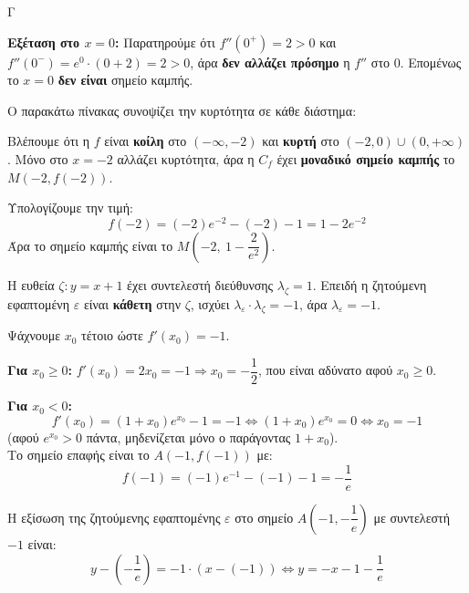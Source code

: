 \begin{thema}{Γ}
\begin{erwthma}
\textbf{Εξέταση στο $x=0$:} Παρατηρούμε ότι $f''(0^+)=2>0$ και $f''(0^-)=e^0\cdot(0+2)=2>0$, άρα \textbf{δεν αλλάζει πρόσημο} η $f''$ στο $0$. Επομένως το $x=0$ \textbf{δεν είναι} σημείο καμπής.

Ο παρακάτω πίνακας συνοψίζει την κυρτότητα σε κάθε διάστημα:
\begin{center}
\end{center}
Βλέπουμε ότι η $f$ είναι \textbf{κοίλη} στο $(-\infty,-2)$ και \textbf{κυρτή} στο $(-2,0)\cup(0,+\infty)$. Μόνο στο $x=-2$ αλλάζει κυρτότητα, άρα η $C_f$ έχει \textbf{μοναδικό σημείο καμπής} το $M\!\left(-2,f(-2)\right)$.

Υπολογίζουμε την τιμή:
\[f(-2)=(-2)e^{-2}-(-2)-1=1-2e^{-2}\]
Άρα το σημείο καμπής είναι το $M\!\left(-2,\ 1-\dfrac{2}{e^2}\right)$.

\item Η ευθεία $\zeta:y=x+1$ έχει συντελεστή διεύθυνσης $\lambda_\zeta=1$. Επειδή η ζητούμενη εφαπτομένη $\varepsilon$ είναι \textbf{κάθετη} στην $\zeta$, ισχύει $\lambda_\varepsilon\cdot\lambda_\zeta=-1$, άρα $\lambda_\varepsilon=-1$.

Ψάχνουμε $x_0$ τέτοιο ώστε $f'(x_0)=-1$.

\textbf{Για $x_0\geq0$:} $f'(x_0)=2x_0=-1\Rightarrow x_0=-\dfrac{1}{2}$, που είναι αδύνατο αφού $x_0\geq0$.

\textbf{Για $x_0<0$:}
\[f'(x_0)=(1+x_0)e^{x_0}-1=-1\Leftrightarrow(1+x_0)e^{x_0}=0\Leftrightarrow x_0=-1\]
(αφού $e^{x_0}>0$ πάντα, μηδενίζεται μόνο ο παράγοντας $1+x_0$). \\
Το σημείο επαφής είναι το $A\!\left(-1,f(-1)\right)$ με:
\[f(-1)=(-1)e^{-1}-(-1)-1=-\frac{1}{e}\]

Η εξίσωση της ζητούμενης εφαπτομένης $\varepsilon$ στο σημείο $A\!\left(-1,-\dfrac{1}{e}\right)$ με συντελεστή $-1$ είναι:
\[y-\left(-\frac{1}{e}\right)=-1\cdot(x-(-1))\Leftrightarrow y=-x-1-\frac{1}{e}\]
\end{erwthma}
\end{thema}

